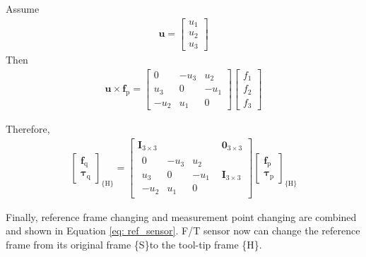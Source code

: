 \par\noindent
Assume  
\begin{equation*}
\begin{split}
\boldsymbol{u}
=
\begin{bmatrix}
u_1\\
u_2\\
u_3
\end{bmatrix}
\end{split}
\end{equation*}
Then
\begin{equation}
\begin{split}
\boldsymbol{u}\times \boldsymbol{f}_\mathrm{p}
=
\begin{bmatrix}
0		&-u_3		&u_2		\\
u_3		&0			&-u_1		\\
-u_2	&u_1		&0		
\end{bmatrix}
\begin{bmatrix}
f_1\\
f_2\\
f_3
\end{bmatrix}
\end{split}
\end{equation}
\par\noindent
Therefore, 
\begin{equation}
\begin{split}
\begin{bmatrix}
\boldsymbol{f}_\mathrm{q}\\ 
\boldsymbol{\tau}_\mathrm{q}
\end{bmatrix}
_{\{ \mathrm{H}\}}
=
\begin{bmatrix}
\mathbf{I}_{3 \times 3} & \boldsymbol{0}_{3 \times 3}\\ 
\begin{matrix}
0		&-u_3		&u_2		\\
u_3		&0			&-u_1		\\
-u_2	&u_1		&0		
\end{matrix} & \mathbf{I}_{3 \times 3}
\end{bmatrix}
\begin{bmatrix}
\boldsymbol{f}_\mathrm{p}\\ 
\boldsymbol{\tau}_\mathrm{p}
\end{bmatrix}
_{\{ \mathrm{H}\}}
\end{split}
\end{equation}
\par
Finally, reference frame changing and measurement point changing are combined and shown in Equation \ref{eq: ref_sensor}. F/T sensor now can change the reference frame from its original frame \{S\}to the tool-tip frame \{H\}.
